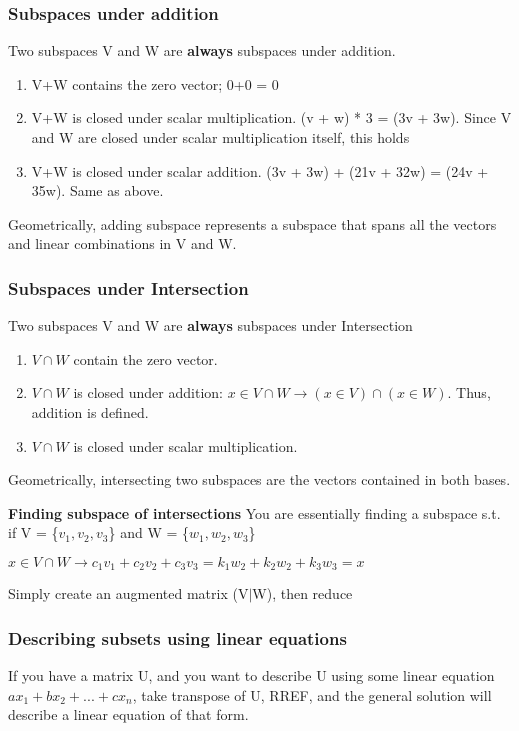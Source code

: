 \documentclass{article}
\newcommand{\sub}[1]{\vspace{10pt}\textbf{#1}}
\begin{document}
\subsubsection{Subspaces under addition}
Two subspaces V and W are \textbf{always} subspaces under addition.
\begin{enumerate}
    \item V+W contains the zero vector; 0+0 = 0
    \item V+W is closed under scalar multiplication. (v + w) * 3 = (3v + 3w). Since V and W are closed under scalar multiplication itself, this holds
    \item V+W is closed under scalar addition. (3v + 3w) + (21v + 32w) = (24v + 35w). Same as above.
\end{enumerate}
Geometrically, adding subspace represents a subspace that spans all the vectors and linear combinations in V and W.

\subsubsection{Subspaces under Intersection}
Two subspaces V and W are \textbf{always} subspaces under Intersection
\begin{enumerate}
    \item $V \cap W$ contain the zero vector.
    \item $V \cap W$ is closed under addition: $x\in V\cap W \rightarrow (x \in V ) \cap (x \in W)$. Thus, addition is defined.
    \item $V \cap W$ is closed under scalar multiplication.
\end{enumerate}

Geometrically, intersecting two subspaces are the vectors contained in both bases.

\sub{Finding subspace of intersections}
You are essentially finding a subspace s.t. if V = \{$v_1, v_2, v_3$\} and W = \{$w_1, w_2, w_3$\}
\begin{center}
    $x \in V \cap W \rightarrow c_1v_1 + c_2v_2 + c_3v_3 = k_1w_2 + k_2w_2 + k_3w_3 = x$
\end{center}
Simply create an augmented matrix (V$|$W), then reduce

\subsubsection{Describing subsets using linear equations}
If you have a matrix U, and you want to describe U using some linear equation $ax_1 + bx_2 + ... + cx_n$, take transpose of U, RREF, and the general solution will describe a linear equation of that form.
\end{document}
